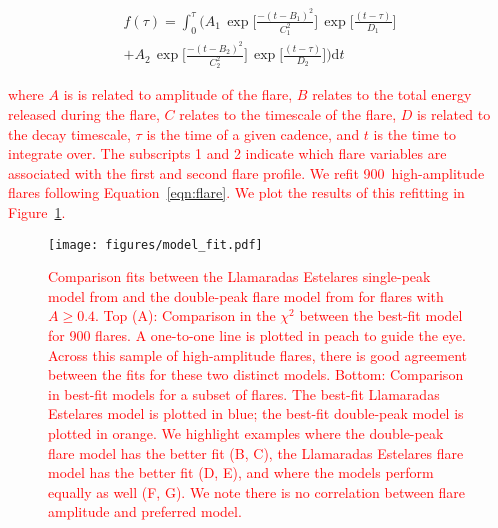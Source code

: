 \documentclass[twocolumn, linenumbers]{aastex631}
\begin{document}
\begin{equation}\label{eqn:flare}
\begin{split}
    f(\tau) = \int_0^\tau\bigg( A_1\, \exp\bigg[\frac{-(t-B_1)^2}{C_1^2}\bigg] \,\exp\bigg[\frac{(t-\tau)}{D_1}\bigg]\\+A_2 \,\exp\bigg[\frac{-(t-B_2)^2}{C_2^2}\bigg] \,\exp\bigg[\frac{(t-\tau)}{D_2}\bigg]\bigg) \textrm{d}t
\end{split}
\end{equation}

\textcolor{red}{where $A$ is is related to amplitude of the flare, $B$ relates
to the total energy released during the flare, $C$ relates to the timescale of
the flare, $D$ is related to the decay timescale, $\tau$ is the time of a given
cadence, and $t$ is the time to integrate over. The subscripts 1 and 2 indicate
which flare variables are associated with the first and second flare profile. We
refit 900~high-amplitude flares following Equation~\ref{eqn:flare}. We plot the
results of this refitting in Figure~\ref{fig:model_fit}.}

\begin{figure}[ht!]
    \begin{centering}
        \texttt{[image: figures/model\_fit.pdf]}
        \caption{
            \textcolor{red}{Comparison fits between the Llamaradas Estelares
            single-peak model from \cite{tovar22} and the double-peak flare model
            from \cite{pietras22} for flares with $A \geq 0.4$. Top (A): Comparison
            in the $\chi^2$ between the best-fit model for 900 flares. A one-to-one
            line is plotted in peach to guide the eye. Across this sample of
            high-amplitude flares, there is good agreement between the fits for
            these two distinct models. Bottom: Comparison in best-fit models for
            a subset of flares. The best-fit Llamaradas Estelares model is plotted
            in blue; the best-fit double-peak model is plotted in orange. We
            highlight examples where the double-peak flare model has the better
            fit (B, C), the Llamaradas Estelares flare model has the better fit
            (D, E), and where the models perform equally as well (F, G). We note
            there is no correlation between flare amplitude and preferred model.}
        }
        \label{fig:model_fit}
    \end{centering}
\end{figure}
\end{document}
